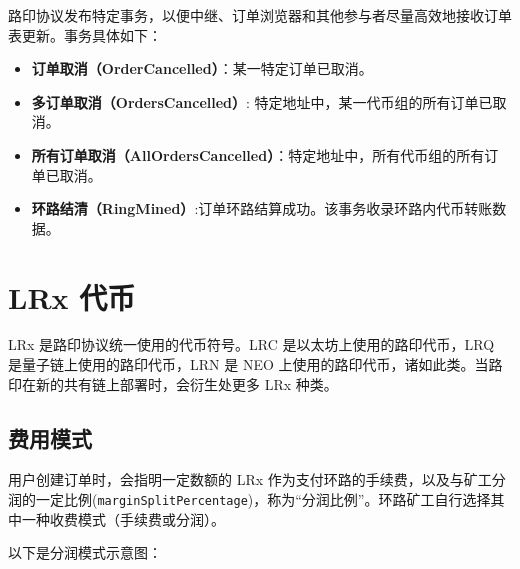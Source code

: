 \documentclass[UTF8,nofonts]{ctexart}%
\makeatletter
\newenvironment{figurehere}
 {\def\@captype{figure}}
 {}
\makeatother
\begin{document}
\begin{multicols}{2}
路印协议发布特定事务，以便中继、订单浏览器和其他参与者尽量高效地接收订单表更新。事务具体如下：

\begin{itemize}
	\item \textbf{订单取消（OrderCancelled）}：某一特定订单已取消。
	\item \textbf{多订单取消（OrdersCancelled）}: 特定地址中，某一代币组的所有订单已取消。
	\item \textbf{所有订单取消（AllOrdersCancelled）}：特定地址中，所有代币组的所有订单已取消。
	\item \textbf{环路结清（RingMined）}:订单环路结算成功。该事务收录环路内代币转账数据。
\end{itemize}


\section{LRx 代币\label{sec:token}}
LRx 是路印协议统一使用的代币符号。LRC 是以太坊上使用的路印代币，LRQ 是量子链上使用的路印代币，LRN 是 NEO 上使用的路印代币，诸如此类。当路印在新的共有链上部署时，会衍生处更多 LRx 种类。

\subsection{费用模式\label{sec:fee_model}} 
用户创建订单时，会指明一定数额的 LRx 作为支付环路的手续费，以及与矿工分润的一定比例(\verb|marginSplitPercentage|)，称为“分润比例”。环路矿工自行选择其中一种收费模式（手续费或分润）。

以下是分润模式示意图：

\begin{center}
\begin{figurehere}
\centering
{}
\end{figurehere}
\end{center}
\end{multicols}
\end{document}
